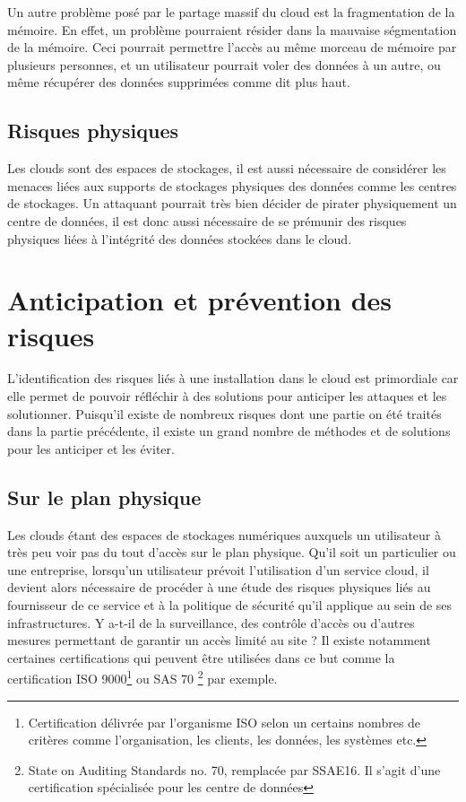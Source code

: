 \documentclass[a4paper, 12pt]{article}
\begin{document}
      Un autre problème posé par le partage massif du cloud est la fragmentation
      de la mémoire. En effet, un problème pourraient résider dans la mauvaise
      ségmentation de la mémoire. Ceci pourrait permettre l'accès au même
      morceau de mémoire par plusieurs personnes, et un utilisateur pourrait
      voler des données à un autre, ou même récupérer des données supprimées
      comme dit plus haut.

    \subsection{Risques physiques}
      Les clouds sont des espaces de stockages, il est aussi nécessaire de
      considérer les menaces liées aux supports de stockages physiques des
      données comme les centres de stockages. Un attaquant pourrait très bien
      décider de pirater physiquement un centre de données, il est donc aussi
      nécessaire de se prémunir des risques physiques liées à l'intégrité des
      données stockées dans le cloud.

  \section{Anticipation et prévention des risques}
      L'identification des risques liés à une installation dans le cloud est
      primordiale car elle permet de pouvoir réfléchir à des solutions pour 
      anticiper les attaques et les solutionner. Puisqu'il existe de nombreux
      risques dont une partie on été traités dans la partie précédente, il 
      existe un grand nombre de méthodes et de solutions pour les anticiper
      et les éviter.

    \subsection{Sur le plan physique}
      Les clouds étant des espaces de stockages numériques auxquels un 
      utilisateur à très peu voir pas du tout d'accès sur le plan physique. 
      Qu'il soit un particulier ou une entreprise, lorsqu'un utilisateur 
      prévoit l'utilisation d'un service cloud, il devient alors nécessaire de
      procéder à une étude des risques physiques liés au fournisseur de 
      ce service et à la politique de sécurité qu'il applique au sein de ses 
      infrastructures. Y a-t-il de la surveillance, des contrôle d'accès ou 
      d'autres mesures permettant de garantir un accès limité au site ? Il
      existe notamment certaines certifications qui peuvent être utilisées dans
      ce but comme la certification ISO 9000\footnote{Certification délivrée 
      par l'organisme ISO selon un certains nombres de critères comme 
      l'organisation, les clients, les données, les systèmes etc.} ou SAS 70
      \footnote{State on Auditing Standards no. 70, remplacée par SSAE16. Il 
      s'agit d'une certification spécialisée pour les centre de données} par 
      exemple. \\
\end{document}
